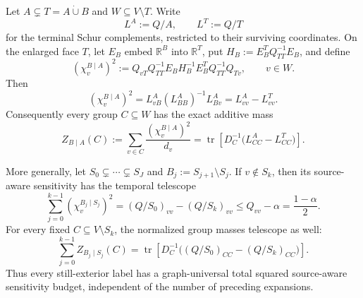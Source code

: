 \begin{theorem}
\label{thm:source-leverage-diagonal-loss}
Let $A\subsetneq T=A\mathbin{\dot\cup}B$ and
$W\subseteq V\setminus T$.  Write
\begin{equation*}
 L^A:=Q/A,
 \qquad
 L^T:=Q/T
\end{equation*}
for the terminal Schur complements, restricted to their surviving
coordinates.  On the enlarged face $T$, let $E_B$ embed $\mathbb R^B$ into
$\mathbb R^T$, put $H_B:=E_B^TQ_{TT}^{-1}E_B$, and define
\begin{equation}
 (\chi_v^{B\mid A})^2
 :=Q_{vT}Q_{TT}^{-1}E_BH_B^{-1}
      E_B^TQ_{TT}^{-1}Q_{Tv},
 \qquad v\in W.
 \label{eq:conditional-source-leverage}
\end{equation}
Then
\begin{equation}
 (\chi_v^{B\mid A})^2
 =L^A_{vB}(L^A_{BB})^{-1}L^A_{Bv}
 =L^A_{vv}-L^T_{vv}.
 \label{eq:source-leverage-diagonal-loss}
\end{equation}
Consequently every group $C\subseteq W$ has the exact additive mass
\begin{equation}
 Z_{B\mid A}(C)
 :=\sum_{v\in C}\frac{(\chi_v^{B\mid A})^2}{d_v}
 =\operatorname{tr}\!\left[
  D_C^{-1}\bigl(L^A_{CC}-L^T_{CC}\bigr)
 \right].
 \label{eq:group-diagonal-loss}
\end{equation}

More generally, let
$S_0\subsetneq\cdots\subsetneq S_J$ and
$B_j:=S_{j+1}\setminus S_j$.  If $v\notin S_k$, then its source-aware
sensitivity has the temporal telescope
\begin{equation}
 \sum_{j=0}^{k-1}(\chi_v^{B_j\mid S_j})^2
 =(Q/S_0)_{vv}-(Q/S_k)_{vv}
 \leq Q_{vv}-\alpha
 =\frac{1-\alpha}{2}.
 \label{eq:source-leverage-temporal-telescope}
\end{equation}
For every fixed $C\subseteq V\setminus S_k$, the normalized group masses
telescope as well:
\begin{equation}
 \sum_{j=0}^{k-1}Z_{B_j\mid S_j}(C)
 =\operatorname{tr}\!\left[
 D_C^{-1}\bigl((Q/S_0)_{CC}-(Q/S_k)_{CC}\bigr)
 \right].
 \label{eq:group-diagonal-temporal-telescope}
\end{equation}
Thus every still-exterior label has a graph-universal total squared
source-aware sensitivity budget, independent of the number of preceding
expansions.
\end{theorem}

